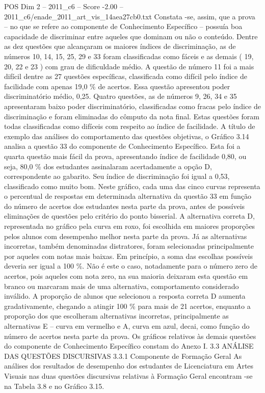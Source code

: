 \begin{textsample}{POS Dim 2 – 2011\_c6 – Score -2.00 – 2011\_c6/enade\_2011\_art\_vis\_14aea27cb0.txt}
Constata -se, assim, que a prova – no que se refere ao componente de Conhecimento Específico – possuía boa capacidade de discriminar entre aqueles que dominam ou não o conteúdo.
Dentre as dez questões que alcançaram os maiores índices de discriminação, as de números 10, 14, 15, 25, 29 e 33 foram classificadas como fáceis e as demais ( 19, 20, 22 e 23 ) com grau de dificuldade médio.
A questão de número 11 foi a mais difícil dentre as 27 questões específicas, classificada como difícil pelo índice de facilidade com apenas 19,0 \% de acertos.
Essa questão apresentou poder discriminatório médio, 0,25.
Quatro questões, as de números 9, 26, 34 e 35 apresentaram baixo poder discriminatório, classificadas como fracas pelo índice de discriminação e foram eliminadas do cômputo da nota final.
Estas questões foram todas classificadas como difíceis com respeito ao índice de facilidade.
A título de exemplo das análises do comportamento das questões objetivas, o Gráfico 3.14 analisa a questão 33 do componente de Conhecimento Específico.
Esta foi a quarta questão mais fácil da prova, apresentando índice de facilidade 0,80, ou seja, 80,0 \% dos estudantes assinalaram acertadamente a opção D, correspondente ao gabarito.
Seu índice de discriminação foi igual a 0,53, classificado como muito bom.
Neste gráfico, cada uma das cinco curvas representa o percentual de respostas em determinada alternativa da questão 33 em função do número de acertos dos estudantes nesta parte da prova, antes de possíveis eliminações de questões pelo critério do ponto bisserial.
A alternativa correta D, representada no gráfico pela curva em roxo, foi escolhida em maiores proporções pelos alunos com desempenho melhor nesta parte da prova.
Já as alternativas incorretas, também denominadas distratores, foram selecionadas principalmente por aqueles com notas mais baixas.
Em princípio, a soma das escolhas possíveis deveria ser igual a 100 \%.
Não é este o caso, notadamente para o número zero de acertos, pois aqueles com nota zero, na sua maioria deixaram esta questão em branco ou marcaram mais de uma alternativa, comportamento considerado inválido.
A proporção de alunos que selecionou a resposta correta D aumenta gradativamente, chegando a atingir 100 \% para mais de 21 acertos, enquanto a proporção dos que escolheram alternativas incorretas, principalmente as alternativas E – curva em vermelho e A, curva em azul, decai, como função do número de acertos nesta parte da prova.
Os gráficos relativos às demais questões do componente de Conhecimento Específico constam do Anexo I. 3.3 ANÁLISE DAS QUESTÕES DISCURSIVAS 3.3.1 Componente de Formação Geral As análises dos resultados de desempenho dos estudantes de Licenciatura em Artes Visuais nas duas questões discursivas relativas à Formação Geral encontram -se na Tabela 3.8 e no Gráfico 3.15.

\end{textsample}
